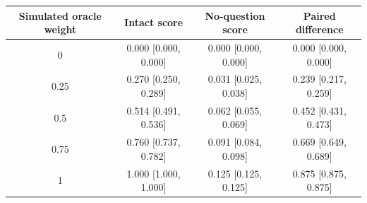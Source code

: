 \begin{tabular}{cccc}\toprule
Simulated oracle weight & Intact score & No-question score & Paired difference\\\midrule
0 & 0.000 [0.000, 0.000] & 0.000 [0.000, 0.000] & 0.000 [0.000, 0.000]\\
0.25 & 0.270 [0.250, 0.289] & 0.031 [0.025, 0.038] & 0.239 [0.217, 0.259]\\
0.5 & 0.514 [0.491, 0.536] & 0.062 [0.055, 0.069] & 0.452 [0.431, 0.473]\\
0.75 & 0.760 [0.737, 0.782] & 0.091 [0.084, 0.098] & 0.669 [0.649, 0.689]\\
1 & 1.000 [1.000, 1.000] & 0.125 [0.125, 0.125] & 0.875 [0.875, 0.875]\\\bottomrule\end{tabular}

